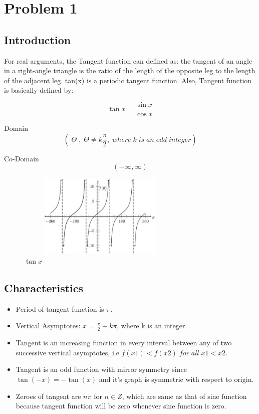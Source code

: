 \documentclass{article}
\begin{document}
\pagebreak
\tableofcontents
\pagebreak

\chapter{Problem 1}
\section{Introduction}
For real arguments, the Tangent function can defined as: the
tangent of an angle in a right-angle triangle is the ratio of the length of the opposite leg to the length of the adjacent leg.
tan(x) is a periodic tangent function.
Also, Tangent function is basically defined by:

\[ \tan x =  \frac{\sin x}{\cos x}\]









Domain\[(\; \Theta \; , \;\Theta \neq k\frac{\pi}{2}, \;where\; k\; is\; an\; odd\; integer) \]


Co-Domain
\[( -\infty , \infty )\]
\begin{figure}[h!]
  \centering
  \includegraphics[width=8cm,height=4cm,keepaspectratio]{tan.jpg}
  \caption{$\tan x$}
\end{figure}


\section{Characteristics}
\begin{itemize}
   \item Period of tangent function is \(\pi\). 
   \item Vertical Asymptotes: $x$ = \(\frac{\pi}{2} + k \pi \), where k is an integer. 
   \item Tangent is an increasing function in every interval between any of two successive vertical asymptotes, i.e \(f(x1) < f(x2)\; for\; all\; x1 < x2\). 
   \item Tangent is an odd function with mirror symmetry since \( \tan(-x) = - \tan(x)\) and it’s graph is symmetric with respect to origin. 
   \item  Zeroes of tangent are $n\pi$ for \(n \in Z\), which are same as that of sine function because tangent function will be zero whenever sine function is zero. 
\end{itemize}
\pagebreak
\end{document}
